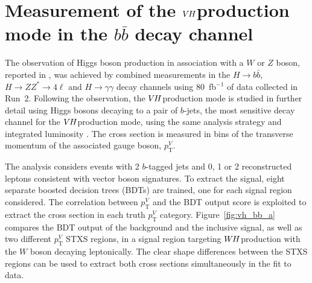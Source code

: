\documentclass{moriond}
\def\wh{\texorpdfstring{\ensuremath{W\kern -0.1em H}\xspace}{WH\xspace}}
\def\vh{\texorpdfstring{\ensuremath{V\kern -0.1em H}\xspace}{VH\xspace}}
\begin{document}
\section{Measurement of the \vh production mode in the $b\bar b$ decay channel}\label{sec:vh_bb}

The observation of Higgs boson production in association with a $W$ or $Z$ boson, reported in
\cite{HIGG-2018-04}, was achieved by combined measurements in the $H{\rightarrow}b\bar b$,
$H{\rightarrow}ZZ^*{\rightarrow}4\ell$ and $H{\rightarrow}\gamma\gamma$ decay channels using
80~fb$^{-1}$ of data collected in Run~2.
Following the observation, the \vh production mode is studied in further detail using Higgs bosons
decaying to a pair of $b$-jets, the most sensitive decay channel for the \vh production mode,
using the same analysis strategy and integrated luminosity \cite{Aaboud:2019nan}.
The cross section is measured in bins of the transverse momentum of the associated gauge boson,
$p^{V}_\mathrm{T}$.

The analysis considers events with 2 $b$-tagged jets and 0, 1 or 2 reconstructed leptons consistent
with vector boson signatures. To extract the signal, eight separate boosted decision trees (BDTs)
are trained, one for each signal region considered.
The correlation between $p^{V}_\mathrm{T}$ and the BDT output score is exploited
to extract the cross section in each truth $p^{V}_\mathrm{T}$ category.
Figure~\ref{fig:vh_bb_a} compares the BDT output of the background and the inclusive signal,
as well as two different $p^{V}_\mathrm{T}$
STXS regions, in a signal region targeting \wh production with the $W$ boson decaying leptonically.
The clear shape differences between the STXS regions can be used to
extract both cross sections simultaneously in the fit to data.
\end{document}
